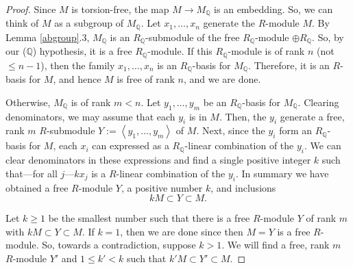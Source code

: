 \documentclass[11pt,letterpaper]{amsart}
\begin{document}
\begin{proof}
Since $M$ is torsion-free, the map $M\rightarrow M_{\mathbb Q}$ is an embedding. So, we can think of $M$ as a subgroup of $M_{\mathbb Q}$. 
Let $x_1, \dots, x_n$ generate the $R$-module $M$. By Lemma \ref{abgroup}.3, $M_{\mathbb{Q}}$ is an $R_{\mathbb Q}$-submodule of the free $R_{\mathbb Q}$-module $\oplus R_{\mathbb Q}$. So, by our ($\mathbb{Q}$) hypothesis, it is a free $R_{\mathbb Q}$-module. If this $R_{\mathbb Q}$-module is of rank $n$ (not $\leqslant n - 1$), then the family $x_1, \ldots, x_n$ is an $R_{\mathbb Q}$-basis for $M_{\mathbb Q}$. Therefore, it is an $R$-basis for $M$, and hence $M$ is free of rank $n$, and we are done. 

Otherwise, $M_{\mathbb{Q}}$ is of rank $m < n$. Let $y_1,\ldots, y_m$ be an $R_{\mathbb Q}$-basis for $M_{\mathbb Q}$. Clearing denominators, we may assume that each $y_i$ is in $M$. Then, the $y_i$ generate a free, rank $m$ $R$-submodule $Y:=\left<y_1,\dots,y_m\right>$ of $M$. Next, since the $y_i$ form an $R_{\mathbb Q}$-basis for $M$, each $x_i$ can expressed as a $R_{\mathbb Q}$-linear combination of the $y_i$. We can clear denominators in these expressions and find a single positive integer $k$ such that---for all $j$---$kx_j$ is a $R$-linear combination of the $y_i$. In summary we have obtained a free $R$-module $Y$, a positive number $k$, and inclusions
$$
kM\subset Y\subset M.
$$

Let $k\geq 1$ be the smallest number such that there is a free $R$-module $Y$ of rank $m$ with $kM\subset Y\subset M$. If $k=1$, then we are done since then $M=Y$ is a free $R$-module. So, towards a contradiction, suppose $k>1$. We will find a free, rank $m$ $R$-module $Y'$ and $1\leq k'<k$ such that $k'M\subset Y'\subset M$.  


\end{proof}
\end{document}
